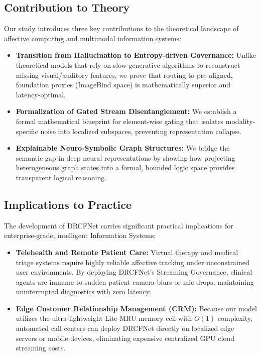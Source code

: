 \documentclass[sn-mathphys,Numbered]{sn-jnl}
\theoremstyle{thmstyleone}
\theoremstyle{thmstyletwo}
\theoremstyle{thmstylethree}
\begin{document}
\subsection{Contribution to Theory}\label{subsec:theory_contrib}
Our study introduces three key contributions to the theoretical landscape of affective computing and multimodal information systems:
\begin{itemize}
    \item \textbf{Transition from Hallucination to Entropy-driven Governance:} Unlike theoretical models that rely on slow generative algorithms to reconstruct missing visual/auditory features, we prove that routing to pre-aligned, foundation proxies (ImageBind space) is mathematically superior and latency-optimal.
    \item \textbf{Formalization of Gated Stream Disentanglement:} We establish a formal mathematical blueprint for element-wise gating that isolates modality-specific noise into localized subspaces, preventing representation collapse.
    \item \textbf{Explainable Neuro-Symbolic Graph Structures:} We bridge the semantic gap in deep neural representations by showing how projecting heterogeneous graph states into a formal, bounded logic space provides transparent logical reasoning.
\end{itemize}

\subsection{Implications to Practice}\label{subsec:practice_contrib}
The development of DRCFNet carries significant practical implications for enterprise-grade, intelligent Information Systems:
\begin{itemize}
    \item \textbf{Telehealth and Remote Patient Care:} Virtual therapy and medical triage systems require highly reliable affective tracking under unconstrained user environments. By deploying DRCFNet's Streaming Governance, clinical agents are immune to sudden patient camera blurs or mic drops, maintaining uninterrupted diagnostics with zero latency.
    \item \textbf{Edge Customer Relationship Management (CRM):} Because our model utilizes the ultra-lightweight Lite-MRU memory cell with $O(1)$ complexity, automated call centers can deploy DRCFNet directly on localized edge servers or mobile devices, eliminating expensive centralized GPU cloud streaming costs.
\end{itemize}
\end{document}
